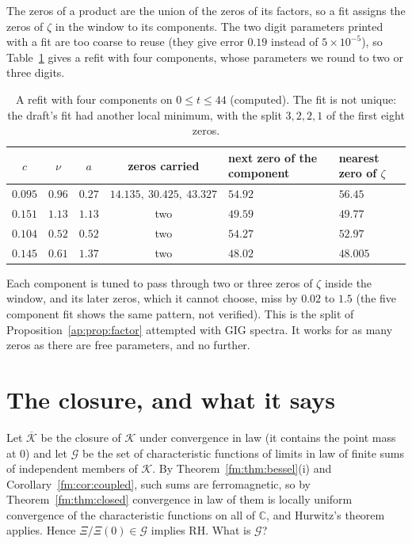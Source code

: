 The zeros of a product are the union of the zeros of its factors, so a fit assigns the zeros of $\zeta$ in the window to its components. The two digit parameters printed with a fit are too coarse to reuse (they give error $0.19$ instead of $5\times10^{-5}$), so Table~\ref{ap:tab:carry} gives a refit with four components, whose parameters we round to two or three digits.
\begin{table}[t]
\centering
\footnotesize
\setlength{\tabcolsep}{4pt}
\begin{tabular}{ccccll}
\toprule
$c$ & $\nu$ & $a$ & zeros carried & next zero of the component & nearest zero of $\zeta$\\
\midrule
$0.095$ & $0.96$ & $0.27$ & $14.135,\ 30.425,\ 43.327$ & $54.92$ & $56.45$\\
$0.151$ & $1.13$ & $1.13$ & two & $49.59$ & $49.77$\\
$0.104$ & $0.52$ & $0.52$ & two & $54.27$ & $52.97$\\
$0.145$ & $0.61$ & $1.37$ & two & $48.02$ & $48.005$\\
\bottomrule
\end{tabular}
\caption{A refit with four components on $0\le t\le44$ (computed). The fit is not unique: the draft's fit had another local minimum, with the split $3,2,2,1$ of the first eight zeros.}\label{ap:tab:carry}
\end{table}
Each component is tuned to pass through two or three zeros of $\zeta$ inside the window, and its later zeros, which it cannot choose, miss by $0.02$ to $1.5$ (the five component fit shows the same pattern, not verified). This is the split of Proposition~\ref{ap:prop:factor} attempted with GIG spectra. It works for as many zeros as there are free parameters, and no further.

\section{The closure, and what it says}\label{ap:sec:closure}

Let $\overline{\mathcal K}$ be the closure of $\mathcal K$ under convergence in law (it contains the point mass at $0$) and let $\mathcal G$ be the set of characteristic functions of limits in law of finite sums of independent members of $\mathcal K$. By Theorem~\ref{fm:thm:bessel}(i) and Corollary~\ref{fm:cor:coupled}, such sums are ferromagnetic, so by Theorem~\ref{fm:thm:closed} convergence in law of them is locally uniform convergence of the characteristic functions on all of $\mathbb C$, and Hurwitz's theorem applies. Hence $\Xi/\Xi(0)\in\mathcal G$ implies RH. What is $\mathcal G$?


